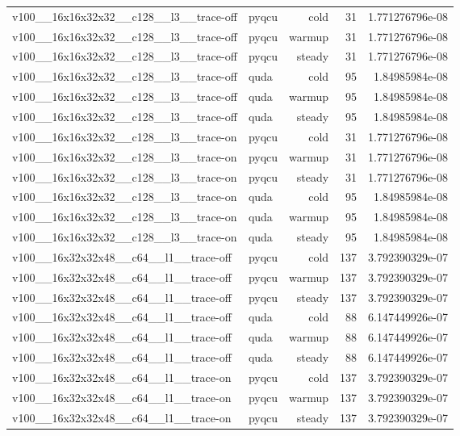 \begin{table}[htbp]
\begin{tabular}{@{}llrrr@{}}
v100\_\_16x16x32x32\_\_c128\_\_l3\_\_trace-off & pyqcu & cold & 31 & 1.771276796e-08 \\
v100\_\_16x16x32x32\_\_c128\_\_l3\_\_trace-off & pyqcu & warmup & 31 & 1.771276796e-08 \\
v100\_\_16x16x32x32\_\_c128\_\_l3\_\_trace-off & pyqcu & steady & 31 & 1.771276796e-08 \\
v100\_\_16x16x32x32\_\_c128\_\_l3\_\_trace-off & quda & cold & 95 & 1.84985984e-08 \\
v100\_\_16x16x32x32\_\_c128\_\_l3\_\_trace-off & quda & warmup & 95 & 1.84985984e-08 \\
v100\_\_16x16x32x32\_\_c128\_\_l3\_\_trace-off & quda & steady & 95 & 1.84985984e-08 \\
v100\_\_16x16x32x32\_\_c128\_\_l3\_\_trace-on & pyqcu & cold & 31 & 1.771276796e-08 \\
v100\_\_16x16x32x32\_\_c128\_\_l3\_\_trace-on & pyqcu & warmup & 31 & 1.771276796e-08 \\
v100\_\_16x16x32x32\_\_c128\_\_l3\_\_trace-on & pyqcu & steady & 31 & 1.771276796e-08 \\
v100\_\_16x16x32x32\_\_c128\_\_l3\_\_trace-on & quda & cold & 95 & 1.84985984e-08 \\
v100\_\_16x16x32x32\_\_c128\_\_l3\_\_trace-on & quda & warmup & 95 & 1.84985984e-08 \\
v100\_\_16x16x32x32\_\_c128\_\_l3\_\_trace-on & quda & steady & 95 & 1.84985984e-08 \\
v100\_\_16x32x32x48\_\_c64\_\_l1\_\_trace-off & pyqcu & cold & 137 & 3.792390329e-07 \\
v100\_\_16x32x32x48\_\_c64\_\_l1\_\_trace-off & pyqcu & warmup & 137 & 3.792390329e-07 \\
v100\_\_16x32x32x48\_\_c64\_\_l1\_\_trace-off & pyqcu & steady & 137 & 3.792390329e-07 \\
v100\_\_16x32x32x48\_\_c64\_\_l1\_\_trace-off & quda & cold & 88 & 6.147449926e-07 \\
v100\_\_16x32x32x48\_\_c64\_\_l1\_\_trace-off & quda & warmup & 88 & 6.147449926e-07 \\
v100\_\_16x32x32x48\_\_c64\_\_l1\_\_trace-off & quda & steady & 88 & 6.147449926e-07 \\
v100\_\_16x32x32x48\_\_c64\_\_l1\_\_trace-on & pyqcu & cold & 137 & 3.792390329e-07 \\
v100\_\_16x32x32x48\_\_c64\_\_l1\_\_trace-on & pyqcu & warmup & 137 & 3.792390329e-07 \\
v100\_\_16x32x32x48\_\_c64\_\_l1\_\_trace-on & pyqcu & steady & 137 & 3.792390329e-07 \\

\end{tabular}
\end{table}
